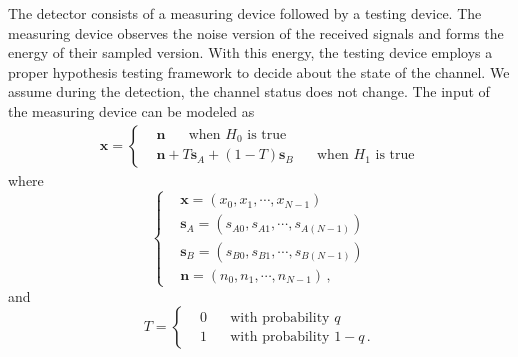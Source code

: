 The detector consists of a measuring device followed by a testing device. The measuring device observes the noise version of the received signals and forms the energy of their sampled version. With this energy, the testing device employs a proper hypothesis testing framework to decide about the state of the channel. We assume during the detection, the channel status does not change. The input of the measuring device can be modeled as 
\begin{eqnarray}
  \mathbf{x} = \begin{cases}
    &\mathbf{n}\;\;\;\;\;\;\text{when $H_0$ is true}\\
    &\mathbf{n} + T\mathbf{s}_A + (1-T)\mathbf{s}_B\;\;\;\;\;\;\text{when $H_1$ is true}
  \end{cases}
  \label{equ:input2energy}
\end{eqnarray}
where
\begin{equation}
  \begin{cases}
	&\mathbf{x} = (x_0, x_1, \cdots, x_{N-1})\\
	&\mathbf{s}_A = (s_{A0}, s_{A1}, \cdots, s_{A(N-1)})\\
	&\mathbf{s}_B = (s_{B0}, s_{B1}, \cdots, s_{B(N-1)})\\
	&\mathbf{n} = (n_{0}, n_{1}, \cdots, n_{N-1})\,,
  \end{cases}
  \label{150621a1}
\end{equation}
and 
\begin{equation}
  T = \begin{cases}
    &0\;\;\;\;\;\;\text{with probability $q$}\\
    &1\;\;\;\;\;\;\text{with probability $1-q$}\,.
  \end{cases}
  \label{150621a2}
\end{equation}


